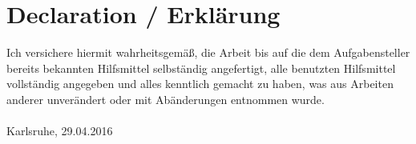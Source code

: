 
\chapter*{Declaration / Erkl\"arung}
Ich versichere hiermit wahrheitsgemäß, die Arbeit bis auf die dem Aufgabensteller bereits bekannten Hilfsmittel selbständig angefertigt,
alle benutzten Hilfsmittel vollständig angegeben und alles kenntlich gemacht zu haben, was aus Arbeiten anderer unverändert oder mit Abänderungen entnommen wurde.\\

\vspace{2cm}
\myname \\
Karlsruhe, 29.04.2016\\
